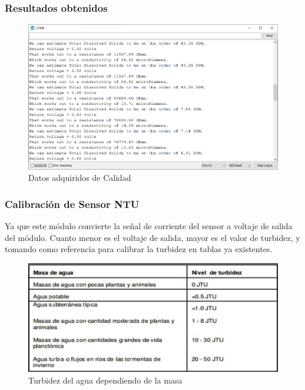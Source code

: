 \documentclass[10pt,a4paper]{article}
\begin{document}
\subsubsection*{Resultados obtenidos}
\begin{figure}[H]
\centering
\includegraphics[scale=0.5]{Resultados/resTds}
\caption{Datos adquiridos de Calidad}
\end{figure}


\subsubsection{Calibración de Sensor NTU}
Ya que este módulo convierte la señal de corriente del sensor a voltaje de salida del módulo. Cuanto menor es el voltaje de salida, mayor es el valor de turbidez, y tomando como referencia para calibrar la turbidez en tablas ya existentes.
\begin{figure}[H]
\centering
\includegraphics[scale=0.4]{Turbidez.JPG}
\caption{Turbidez del agua dependiendo de la masa }
\end{figure}
\end{document}

